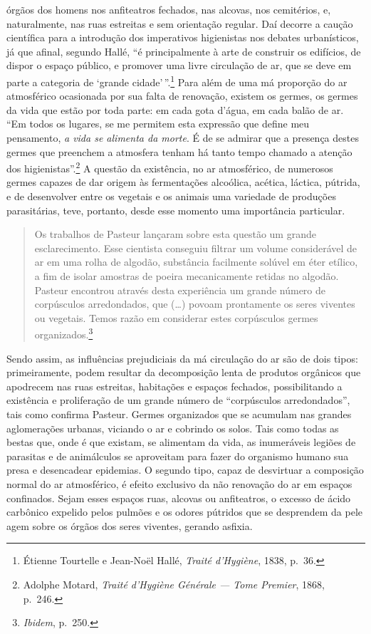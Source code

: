 órgãos dos homens nos anfiteatros fechados, nas alcovas, nos cemitérios,
e, naturalmente, nas ruas estreitas e sem orientação regular. Daí
decorre a caução científica para a introdução dos imperativos
higienistas nos debates urbanísticos, já que afinal, segundo Hallé, ``é
principalmente à arte de construir os edifícios, de dispor o espaço
público, e promover uma livre circulação de ar, que se deve em parte a
categoria de `grande cidade'\,''.\footnote{Étienne Tourtelle e Jean-Noël
  Hallé, \textit{Traité d'Hygiène}, 1838, p.~36.} Para além de uma má
proporção do ar atmosférico ocasionada por sua falta de renovação,
existem os germes, os germes da vida que estão por toda parte: em cada
gota d'água, em cada balão de ar. ``Em todos os lugares, se me permitem
esta expressão que define meu pensamento, \textit{a vida se alimenta da
morte}. É de se admirar que a presença destes germes que preenchem a
atmosfera tenham há tanto tempo chamado a atenção dos
higienistas''.\footnote{Adolphe Motard, \textit{Traité d'Hygiène Générale
  --- Tome Premier}, 1868, p.~246.} A questão da existência, no ar
atmosférico, de numerosos germes capazes de dar origem às fermentações
alcoólica, acética, láctica, pútrida, e de desenvolver entre os vegetais
e os animais uma variedade de produções parasitárias, teve, portanto,
desde esse momento uma importância particular.

\begin{quote}
Os trabalhos de Pasteur lançaram sobre esta questão um grande
esclarecimento. Esse cientista conseguiu filtrar um volume considerável
de ar em uma rolha de algodão, substância facilmente solúvel em éter
etílico, a fim de isolar amostras de poeira mecanicamente retidas no
algodão. Pasteur encontrou através desta experiência um grande número de
corpúsculos arredondados, que (\dots{}) povoam prontamente os seres viventes
ou vegetais. Temos razão em considerar estes corpúsculos germes
organizados.\footnote{\textit{Ibidem}, p.~250.}
\end{quote}

Sendo assim, as influências prejudiciais da má circulação do ar são de
dois tipos: primeiramente, podem resultar da decomposição lenta de
produtos orgânicos que apodrecem nas ruas estreitas, habitações e
espaços fechados, possibilitando a existência e proliferação de um
grande número de ``corpúsculos arredondados'', tais como confirma
Pasteur. Germes organizados que se acumulam nas grandes aglomerações
urbanas, viciando o ar e cobrindo os solos. Tais como todas as bestas
que, onde é que existam, se alimentam da vida, as inumeráveis legiões de
parasitas e de animálculos se aproveitam para fazer do organismo humano
sua presa e desencadear epidemias. O segundo tipo, capaz de desvirtuar a
composição normal do ar atmosférico, é efeito exclusivo da não renovação
do ar em espaços confinados. Sejam esses espaços ruas, alcovas ou
anfiteatros, o excesso de ácido carbônico expelido pelos pulmões e os
odores pútridos que se desprendem da pele agem sobre os órgãos dos seres
viventes, gerando asfixia.

